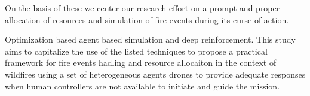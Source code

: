 \documentclass[preprint,review, 11pt,3p,authoryear]{elsarticle}
\newcommand{\rev}{\color{black}} %
\begin{document}
On the basis of these we center our research effort on a prompt and proper allocation of resources and simulation of fire events during its curse of action. 



Optimization based agent based simulation and deep reinforcement.
This study aims to capitalize the use of the listed techniques to propose a practical framework for fire events hadling and resource allocaiton in the context of wildfires using a set of heterogeneous agents drones to provide adequate responses when human controllers are not available to initiate and guide the mission.




\end{document}
